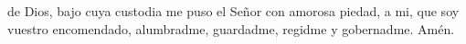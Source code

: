de Dios, bajo cuya custodia me puso el Señor con amorosa piedad, a mi, que soy vuestro encomendado, alumbradme,
guardadme, regidme y gobernadme. Amén.